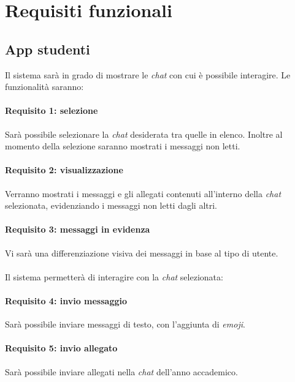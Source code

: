 \section{Requisiti funzionali}

\subsection{App studenti}
Il sistema sarà in grado di mostrare le \emph{chat} con cui è possibile interagire. Le funzionalità saranno:

\paragraph{Requisito 1: selezione\\} 
Sarà possibile selezionare la \emph{chat} desiderata tra quelle in elenco. Inoltre al momento della selezione saranno mostrati i messaggi non letti.

\paragraph{Requisito 2: visualizzazione\\}
Verranno mostrati i messaggi e gli allegati contenuti all’interno della \emph{chat} selezionata, evidenziando i messaggi non letti dagli altri.

\paragraph{Requisito 3: messaggi in evidenza\\}
Vi sarà una differenziazione visiva dei messaggi in base al tipo di utente.\\
\\
Il sistema permetterà di interagire con la \emph{chat} selezionata:

\paragraph{Requisito 4: invio messaggio\\}
Sarà possibile inviare messaggi di testo, con l’aggiunta di \emph{emoji}.

\paragraph{Requisito 5: invio allegato\\}
Sarà possibile inviare allegati nella \emph{chat} dell’anno accademico.

